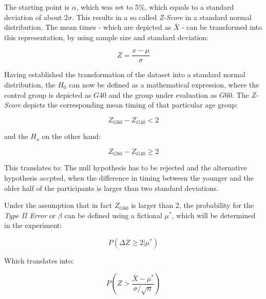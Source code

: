             The starting point is $\alpha$, which was set to 5\%, which equals to a standard deviation of about 2$\sigma$. This results in a so called \textit{Z-Score} in a standard normal distribution. The mean times - which are depicted as $\bar{X}$ - can be transformed into this representation, by using sample size and standard deviation: 

            \begin{equation}\label{z-score}
                Z = \frac{x-\mu}{\sigma}
            \end{equation}  

            Having established the transformation of the dataset into a standard normal distribution, the $H_{0}$ can now be defined as a mathematical expression, where the control group is depicted as $G40$ and the group under evaluation as $G60$. The \textit{Z-Score} depicts the corresponding mean timing of that particular age group:

            \begin{equation}\label{h0}
                Z_{G60} - Z_{G40} < 2
            \end{equation}

            and the $H_{a}$ on the other hand:

            \begin{equation}\label{ha}
                Z_{G60} - Z_{G40} \geq 2
            \end{equation}            

            This translates to: The null hypothesis has to be rejected and the alternative hypothesis accpted, when the difference in timing between the younger and the older half of the participants is larger than two standard deviations.

            Under the assumption that in fact $Z_{G60}$ is larger than 2, the probability for the \textit{Type II Error} or $\beta$ can be defined using a fictional $\mu^{*}$, which will be determined in the experiment:

            \begin{equation}\label{beta-probability}
                P(\Delta Z\geq2|\mu^{*})
            \end{equation} 

            Which translates into:

            \begin{equation}\label{beta-probability2}
                P(Z>\frac{\bar{X}-\mu^{*}}{\sigma/\sqrt{n}})
            \end{equation}            

